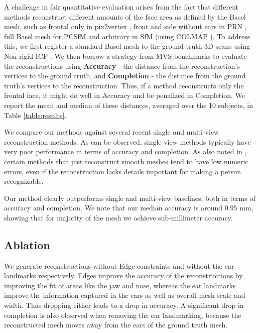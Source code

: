 A challenge in fair quantitative evaluation arises from the fact that different methods reconstruct different amounts of the face area as defined by the Basel mesh, such as frontal only in pix2vertex \cite{sela2017unrestricted} , front and side without ears in PRN \cite{feng2018joint}, full Basel mesh for PCSfM \cite{hernandez2017accurate} and arbitrary in SfM (using COLMAP \cite{schonberger2016structure}). To address this, we first register a standard Basel mesh to the ground truth 3D scans using Non-rigid ICP \cite{amberg2007optimal,booth2018large}. We then borrow a strategy from MVS benchmarks \cite{jensen2014large,knapitsch2017tanks,yao2018mvsnet} to evaluate the reconstructions using \textbf{Accuracy} - the distance from the reconstruction's vertices to the ground truth, and \textbf{Completion} - the distance from the ground truth's vertices to the reconstruction. Thus, if a method reconstructs only the frontal face, it might do well in Accuracy and be penalized in Completion. We report the mean and median of these distances, averaged over the 10 subjects, in Table \ref{table:results}.

We compare our methods against several recent single and multi-view reconstruction methods. 
As can be observed, single view methods typically have very poor performance in terms of accuracy and completion. 
As also noted in \cite{hernandez2017accurate}, certain methods that just reconstruct smooth meshes tend to have low numeric errors, even if the reconstruction lacks details important for making a person recognizable.

Our method clearly outperforms single and multi-view baselines, both in terms of accuracy and completion. We note that our median accuracy is around 0.95 mm, showing that for majority of the mesh we achieve sub-millimeter accuracy.

\subsection{Ablation} We generate reconstructions without Edge constraints and without the ear landmarks respectively. Edges improve the accuracy of the reconstructions by improving the fit of areas like the jaw and nose, whereas the ear landmarks improve the information captured in the ears as well as overall mesh scale and width. Thus dropping either leads to a drop in accuracy. A significant drop in completion is also observed when removing the ear landmarking, because the reconstructed mesh moves away from the ears of the ground truth mesh.




